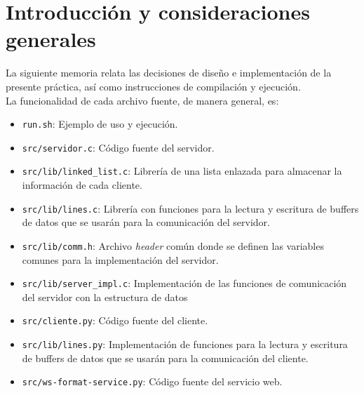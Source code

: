 \section{Introducción y consideraciones generales}

La siguiente memoria relata las decisiones de diseño e implementación de la presente práctica, así como instrucciones de compilación y ejecución.\\

La funcionalidad de cada archivo fuente, de manera general, es:
\begin{itemize}
    \item \texttt{run.sh}: Ejemplo de uso y ejecución.
    \item \texttt{src/servidor.c}: Código fuente del servidor.
    \item \texttt{src/lib/linked\_list.c}: Librería de una lista enlazada para almacenar la información de cada cliente.
    \item \texttt{src/lib/lines.c}: Librería con funciones para la lectura y escritura de buffers de datos que se usarán para la comunicación del servidor.
    \item \texttt{src/lib/comm.h}: Archivo \textit{header} común donde se definen las variables comunes para la implementación del servidor.
    \item \texttt{src/lib/server\_impl.c}: Implementación de las funciones de comunicación del servidor con la estructura de datos
    \item \texttt{src/cliente.py}: Código fuente del cliente.
    \item \texttt{src/lib/lines.py}: Implementación de funciones para la lectura y escritura de buffers de datos que se usarán para la comunicación del cliente.
    \item \texttt{src/ws-format-service.py}: Código fuente del servicio web.
\end{itemize}